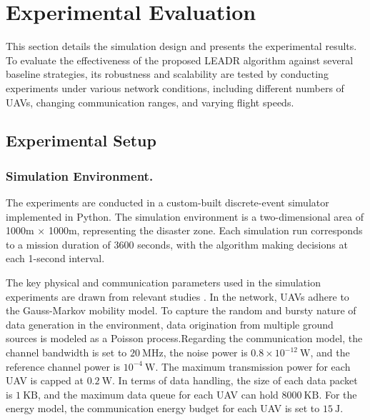 \documentclass[runningheads]{llncs}
\begin{document}
\section{Experimental Evaluation}
\label{s5}
This section details the simulation design and presents the experimental results. To evaluate the effectiveness of the proposed LEADR algorithm against several baseline strategies, its robustness and scalability are tested by conducting experiments under various network conditions, including different numbers of UAVs, changing communication ranges, and varying flight speeds.

\subsection{Experimental Setup}

\subsubsection{Simulation Environment.} The experiments are conducted in a custom-built discrete-event simulator implemented in Python. The simulation environment is a two-dimensional area of 1000m × 1000m, representing the disaster zone. Each simulation run corresponds to a mission duration of 3600 seconds, with the algorithm making decisions at each 1-second interval.

The key physical and communication parameters used in the simulation experiments are drawn from relevant studies \cite{qtar,DRLFR}. In the network, UAVs adhere to the Gauss-Markov mobility model. To capture the random and bursty nature of data generation in the environment, data origination from multiple ground sources is modeled as a Poisson process.Regarding the communication model, the channel bandwidth is set to $20~\mathrm{MHz}$, the noise power is $0.8 \times 10^{-12}~\mathrm{W}$, and the reference channel power is $10^{-4}~\mathrm{W}$. The maximum transmission power for each UAV is capped at $0.2~\mathrm{W}$. In terms of data handling, the size of each data packet is $1~\mathrm{KB}$, and the maximum data queue for each UAV can hold $8000~\mathrm{KB}$. For the energy model, the communication energy budget for each UAV is set to $15~\mathrm{J}$.
\end{document}

